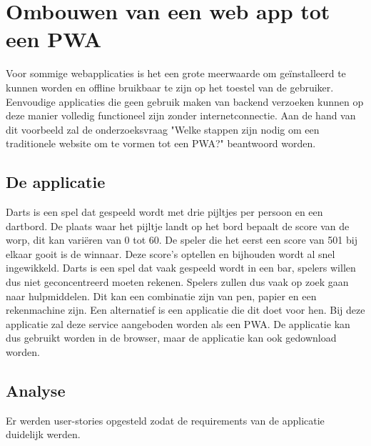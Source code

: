 \chapter{Ombouwen van een web app tot een PWA}
\label{ch:TransformerenNaarEenPWA}



Voor sommige webapplicaties is het een grote meerwaarde om geïnstalleerd te kunnen worden  en offline bruikbaar te zijn op het toestel van de gebruiker.\autocite{Mozilla2020c} Eenvoudige applicaties die geen gebruik maken van backend verzoeken kunnen op deze manier volledig functioneel zijn zonder internetconnectie. 
Aan de hand van dit voorbeeld zal de onderzoeksvraag "Welke stappen zijn nodig om een traditionele website om te vormen tot een PWA?" beantwoord worden.

\section{De applicatie}

	Darts is een spel dat gespeeld wordt met drie pijltjes per persoon en een dartbord. De plaats waar het pijltje landt op het bord bepaalt de score van de worp, dit kan variëren van 0 tot 60. De speler die het eerst een score van 501 bij elkaar gooit is de winnaar. Deze score’s optellen en bijhouden wordt al snel ingewikkeld. Darts is een spel dat vaak gespeeld wordt in een bar, spelers willen dus niet geconcentreerd moeten rekenen. Spelers zullen dus vaak op zoek gaan naar hulpmiddelen. Dit kan een combinatie zijn van pen, papier en een rekenmachine zijn. Een alternatief is een applicatie die dit doet voor hen. Bij deze applicatie zal deze service aangeboden worden als een PWA. De applicatie kan dus gebruikt worden in de browser, maar de applicatie kan ook gedownload worden.

\section{Analyse}

	Er werden user-stories opgesteld zodat de requirements van de applicatie duidelijk werden.  
	
